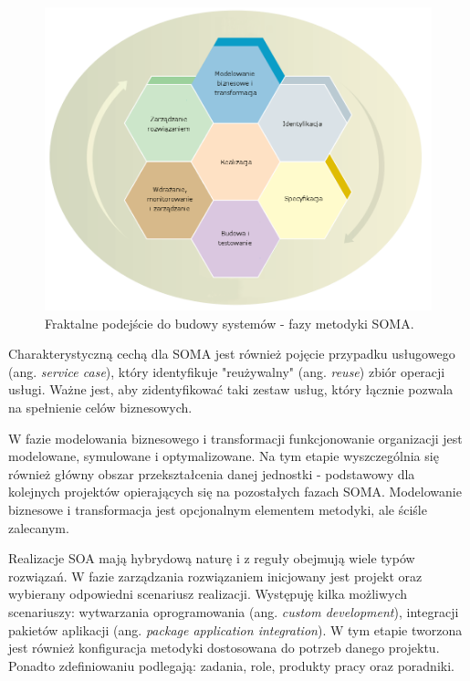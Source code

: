 \begin{figure}[h!tbp]
\begin{centering}
\includegraphics[width=14cm]{img/soma_fractal_lifecycle.png}
\caption[Fraktalne podejście do budowy systemów - fazy metodyki SOMA.]{Fraktalne podejście do budowy systemów - fazy metodyki SOMA. \cite{SOMAArsIBMJour}}\label{soma_fractal_lifecycle}
\end{centering}
\end{figure}

Charakterystyczną cechą dla SOMA jest również pojęcie przypadku usługowego (ang. \textit{service case}), który identyfikuje "reużywalny" (ang. \textit{reuse}) zbiór operacji usługi. Ważne jest, aby zidentyfikować taki zestaw usług, który łącznie pozwala na spełnienie celów biznesowych. \cite{PlatIntGor}

W fazie modelowania biznesowego i transformacji funkcjonowanie organizacji jest modelowane, symulowane i optymalizowane. Na tym etapie wyszczególnia się również główny obszar przekształcenia danej jednostki - podstawowy dla kolejnych projektów opierających się na pozostałych fazach SOMA. Modelowanie biznesowe i transformacja jest opcjonalnym elementem metodyki, ale ściśle zalecanym. 

Realizacje SOA mają hybrydową naturę i z reguły obejmują wiele typów rozwiązań. W fazie zarządzania rozwiązaniem inicjowany jest projekt oraz wybierany odpowiedni scenariusz realizacji. Występuję kilka możliwych scenariuszy: wytwarzania oprogramowania (ang. \textit{custom development}), integracji pakietów aplikacji (ang. \textit{package application integration}). W tym etapie tworzona jest również konfiguracja metodyki dostosowana do potrzeb danego projektu. Ponadto zdefiniowaniu podlegają: zadania, role, produkty pracy oraz poradniki.\cite{SOMAArsIBMJour}


